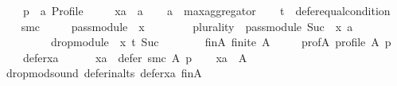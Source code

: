 \begin{isabellebody}
\ \ \ \ p\ {\isacharcolon}{\kern0pt}{\isacharcolon}{\kern0pt}\ {\isachardoublequoteopen}{\isacharprime}{\kern0pt}a\ Profile{\isachardoublequoteclose}\ \isanewline
\ \ \ \ xa\ {\isacharcolon}{\kern0pt}{\isacharcolon}{\kern0pt}\ {\isachardoublequoteopen}{\isacharprime}{\kern0pt}a{\isachardoublequoteclose}\isanewline
\ \ \isamarkupfalse%
\ {\isacharquery}{\kern0pt}a\ {\isacharequal}{\kern0pt}\ {\isachardoublequoteopen}max{\isacharunderscore}{\kern0pt}aggregator{\isachardoublequoteclose}\isanewline
\ \ \isamarkupfalse%
\ {\isacharquery}{\kern0pt}t\ {\isacharequal}{\kern0pt}\ {\isachardoublequoteopen}defer{\isacharunderscore}{\kern0pt}equal{\isacharunderscore}{\kern0pt}condition{\isachardoublequoteclose}\isanewline
\ \ \isamarkupfalse%
\ {\isacharquery}{\kern0pt}smc\ {\isacharequal}{\kern0pt}\isanewline
\ \ \ \ {\isachardoublequoteopen}pass{\isacharunderscore}{\kern0pt}module\ {}\ x\ {\isasymtriangleright}\isanewline
\ \ \ \ \ \ \ {\isacharparenleft}{\kern0pt}{\isacharparenleft}{\kern0pt}plurality{\isasymdown}{\isacharparenright}{\kern0pt}\ {\isasymtriangleright}\ pass{\isacharunderscore}{\kern0pt}module\ {\isacharparenleft}{\kern0pt}Suc\ {}{\isacharparenright}{\kern0pt}\ x{\isacharparenright}{\kern0pt}\ {\isasymparallel}\isactrlsub {\isacharquery}{\kern0pt}a\isanewline
\ \ \ \ \ \ \ \ \ drop{\isacharunderscore}{\kern0pt}module\ {}\ x\ {\isasymcirclearrowleft}\isactrlsub {\isacharquery}{\kern0pt}t\ {\isacharparenleft}{\kern0pt}Suc\ {}{\isacharparenright}{\kern0pt}{\isachardoublequoteclose}\isanewline
\ \ \isamarkupfalse%
\isanewline
\ \ \ \ fin{\isacharunderscore}{\kern0pt}A{\isacharcolon}{\kern0pt}\ {\isachardoublequoteopen}finite\ A{\isachardoublequoteclose}\ \isanewline
\ \ \ \ prof{\isacharunderscore}{\kern0pt}A{\isacharcolon}{\kern0pt}\ {\isachardoublequoteopen}profile\ A\ p{\isachardoublequoteclose}\ \isanewline
\ \ \ \ defer{\isacharunderscore}{\kern0pt}xa{\isacharcolon}{\kern0pt}\isanewline
\ \ \ \ \ \ {\isachardoublequoteopen}xa\ {\isasymin}\ defer\ {\isacharparenleft}{\kern0pt}{\isacharquery}{\kern0pt}smc{\isacharparenright}{\kern0pt}\ A\ p{\isachardoublequoteclose}\isanewline
\ \ \isamarkupfalse%
\ {\isachardoublequoteopen}xa\ {\isasymin}\ A{\isachardoublequoteclose}\isanewline
\ \ \ \ \isamarkupfalse%
\ drop{\isacharunderscore}{\kern0pt}mod{\isacharunderscore}{\kern0pt}sound\ defer{\isacharunderscore}{\kern0pt}in{\isacharunderscore}{\kern0pt}alts\ defer{\isacharunderscore}{\kern0pt}xa\ fin{\isacharunderscore}{\kern0pt}A\isanewline

\end{isabellebody}
